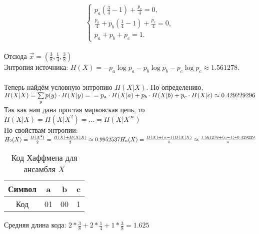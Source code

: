 \documentclass{article}
\begin{document}
\[
 \left\{ 
   \begin{array}{ll}
       p_a(\frac{3}{4} - 1) + \frac{p_c}{4} = 0, \\[1em]
       \frac{p_a}{4} + p_b(\frac{1}{4} - 1) + \frac{p_c}{4} = 0, \\[1em]
       p_a + p_b + p_c = 1.
   \end{array} 
 \right. 
\] \\
Отсюда $\overrightarrow{x} = (\frac{3}{8}, \frac{1}{4}, \frac{3}{8})$\\
Энтропия источника:
$H(X) = -p_a\log{p_a} - p_b\log{p_b} - p_c\log{p_c} \approx 1{.}561278$. \\\\
Теперь найдём условную энтропию $H(X|X)$. По определению,\\
$
H(X|X) = \sum\limits_{y} p(y) \cdot H(X|y) =\\
= p_a \cdot H(X|a) + p_b \cdot H(X|b) + p_c \cdot H(X|c) \approx 0{.}429229296 $\\
Так как нам дана простая марковская цепь, то $H(X|X) = H(X|X^2) = \dots = H(X|X^{\infty})$\\
По свойствам энтропии:\\
$
H_2(X) = \frac{H(X^2)}{2} = \frac{H(X) + H(X|X)}{2} \approx 0{.}9952537 \\ \\
H_n(X) = \frac{H(X) + (n - 1)H(X|X)}{n} \approx \frac{1{.}561278 + (n-1)*0{.}429229}{n}
$

\begin{table}[H]
\begin{tabular}{|c|c|c|c|}
    \hline
  Символ      & a              & b              & c             \\
    \hline
  Код         & 01             & 00             & 1             \\
    \hline
\end{tabular}
\captionsetup{singlelinecheck=off,justification=raggedright}
\caption{\label{tab:widgets}Код Хаффмена для ансамбля $X$}
\end{table}

Средняя длина кода: $2 * \frac{3}{8} + 2 * \frac{1}{4} + 1 * \frac{3}{8} = 1.625$
\end{document}
